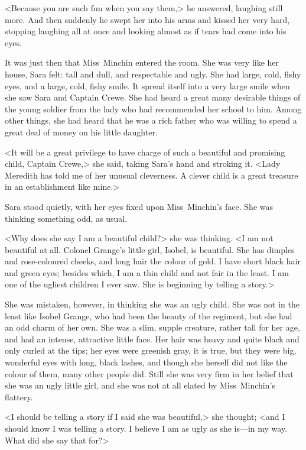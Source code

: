 <Because you are such fun when you say them,> he answered, laughing still more. And then suddenly he swept her into his arms and kissed her very hard, stopping laughing all at once and looking almost as if tears had come into his eyes.

It was just then that Miss~Minchin entered the room. She was very like her house, Sara felt: tall and dull, and respectable and ugly. She had large, cold, fishy eyes, and a large, cold, fishy smile. It spread itself into a very large smile when she saw Sara and Captain Crewe. She had heard a great many desirable things of the young soldier from the lady who had recommended her school to him. Among other things, she had heard that he was a rich father who was willing to spend a great deal of money on his little daughter.

<It will be a great privilege to have charge of such a beautiful and promising child, Captain Crewe,> she said, taking Sara's hand and stroking it. <Lady Meredith has told me of her unusual cleverness. A clever child is a great treasure in an establishment like mine.>

Sara stood quietly, with her eyes fixed upon Miss~Minchin's face. She was thinking something odd, as usual.

<Why does she say I am a beautiful child?> she was thinking. <I am not beautiful at all. Colonel Grange's little girl, Isobel, is beautiful. She has dimples and rose-coloured cheeks, and long hair the colour of gold. I have short black hair and green eyes; besides which, I am a thin child and not fair in the least. I am one of the ugliest children I ever saw. She is beginning by telling a story.>

She was mistaken, however, in thinking she was an ugly child. She was not in the least like Isobel Grange, who had been the beauty of the regiment, but she had an odd charm of her own. She was a slim, supple creature, rather tall for her age, and had an intense, attractive little face. Her hair was heavy and quite black and only curled at the tips; her eyes were greenish gray, it is true, but they were big, wonderful eyes with long, black lashes, and though she herself did not like the colour of them, many other people did. Still she was very firm in her belief that she was an ugly little girl, and she was not at all elated by Miss~Minchin's flattery.

<I should be telling a story if I said she was beautiful,> she thought; <and I should know I was telling a story. I believe I am as ugly as she is—in my way. What did she say that for?>

